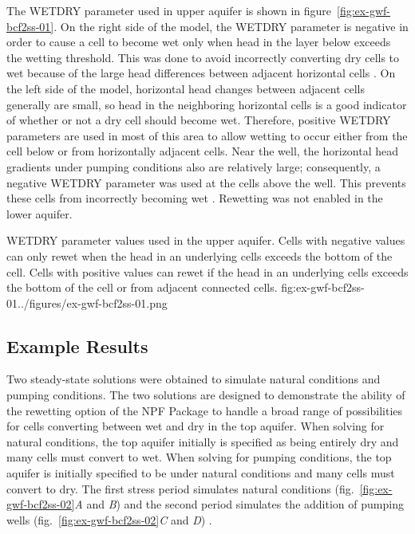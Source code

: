 The WETDRY parameter used in upper aquifer is shown in figure~\ref{fig:ex-gwf-bcf2ss-01}. On the right side of the model, the
WETDRY parameter is negative in order to cause a cell to become wet only when head in the layer below exceeds the wetting threshold. This was done to avoid incorrectly converting dry cells to wet because of the large head differences between adjacent horizontal cells \citep{mcdonaldetal1991wetdry}. On the left side of the model, horizontal head changes between adjacent cells generally are small, so head in the neighboring horizontal cells is a good indicator of whether or not a dry cell should become wet. Therefore, positive WETDRY parameters are used in most of this area to allow wetting to occur either from the cell below or from horizontally adjacent cells. Near the well, the horizontal head gradients under pumping conditions also are relatively large; consequently, a negative WETDRY parameter was used at the cells above the well. This prevents these cells from incorrectly becoming wet \citep{mcdonaldetal1991wetdry}. Rewetting was not enabled in the lower aquifer.

\begin{StandardFigure}{
                                     WETDRY parameter values used in the upper aquifer. Cells with negative values
                                     can only rewet when the head in an underlying cells exceeds the bottom of the cell.
                                     Cells with positive values can rewet if the head in an underlying cells exceeds the 
                                     bottom of the cell or from adjacent connected cells.
                                     }{fig:ex-gwf-bcf2ss-01}{../figures/ex-gwf-bcf2ss-01.png}
\end{StandardFigure}                                 


\subsection{Example Results}

Two steady-state solutions were obtained to simulate natural conditions and pumping conditions. The two solutions are designed to demonstrate the ability of the rewetting option of the NPF Package to handle a broad range of possibilities for cells converting between wet and dry in the top aquifer. When solving for natural conditions, the top aquifer initially is specified as being entirely dry and many cells must convert to wet. When solving for pumping conditions, the top aquifer is initially specified to be under natural conditions and many cells must convert to dry. The first stress period simulates natural conditions (fig.~\ref{fig:ex-gwf-bcf2ss-02}\textit{A} and \textit{B}) and the second period simulates the addition of pumping wells (fig.~\ref{fig:ex-gwf-bcf2ss-02}\textit{C} and \textit{D}) .

